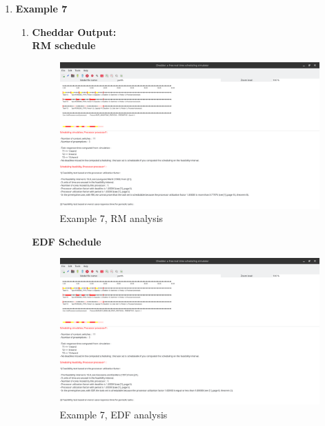 \documentclass[a4paper,11pt]{article}%
\newenvironment{qanda}{\setlength{\parindent}{0pt}}{\bigskip}
\begin{document}
\begin{qanda}
\begin{enumerate}
\begin{enumerate}
\begin{enumerate}
\begin{enumerate}
					            \end{enumerate}
					      \item \textbf{Example 7}
					            \begin{enumerate}
						            \item \textbf{Cheddar Output:}\\
						                  \textbf{RM schedule}
						                  \begin{figure}[H]
							                  \centering
							                  \includegraphics[scale=0.36]{figures/ex7_rm.png}
							                  \caption{Example 7, RM analysis}
						                  \end{figure}
						                  \textbf{EDF Schedule}
						                  \begin{figure}[H]
							                  \centering
							                  \includegraphics[scale=0.36]{figures/ex7_edf.png}
							                  \caption{Example 7, EDF analysis}
						                  \end{figure}

\end{enumerate}
\end{enumerate}
\end{enumerate}
\end{enumerate}
\end{qanda}
\end{document}
